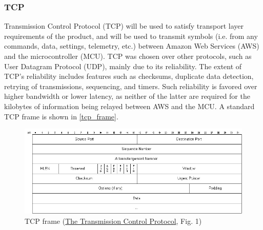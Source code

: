\subsubsection{TCP} \label{tcp_standard} Transmission Control Protocol (TCP) will be used to satisfy transport layer
requirements of the product, and will be used to transmit symbols (i.e.
from any commands, data, settings, telemetry, etc.) between Amazon Web
Services (AWS) and the microcontroller (MCU). TCP was chosen over other
protocols, such as User Datagram Protocol (UDP), mainly due to its
reliability. The extent of TCP's reliability includes features such as
checksums, duplicate data detection, retrying of transmissions, sequencing,
and timers.
Such reliability is favored over higher bandwidth or lower
latency, as neither of the latter are required for the kilobytes
of information being relayed between AWS and the MCU. A standard TCP frame
is shown in \autoref{tcp_frame}.
\begin{figure}[H]
    \caption{TCP frame (\href{https://condor.depaul.edu/jkristof/technotes/tcp.html}{The Transmission Control Protocol}, Fig. 1)}
    \label{tcp_frame}
    \centering
    \includegraphics[width=\textwidth]{images/tcp_frame.jpg}
\end{figure}


